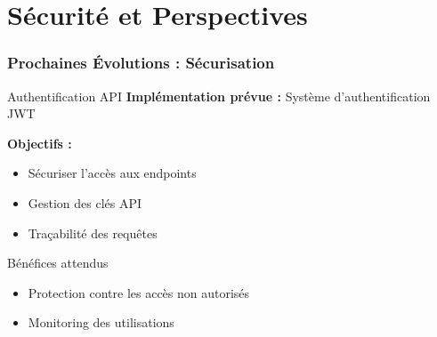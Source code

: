 \documentclass[
	11pt,
	aspectratio=169,
]{beamer}
\begin{document}

\section{Sécurité et Perspectives}

\begin{frame}
	\frametitle{Prochaines Évolutions : Sécurisation}
	
	\begin{block}{Authentification API}
		\textbf{Implémentation prévue :} Système d'authentification JWT
		
		\bigskip
		
		\textbf{Objectifs :}
		\begin{itemize}
			\item Sécuriser l'accès aux endpoints
			\item Gestion des clés API
			\item Traçabilité des requêtes
		\end{itemize}
	\end{block}
	
	\smallskip
	
	\begin{exampleblock}{Bénéfices attendus}
		\begin{itemize}
			\item Protection contre les accès non autorisés
			\item Monitoring des utilisations
		\end{itemize}
	\end{exampleblock}
\end{frame}


\end{document}
